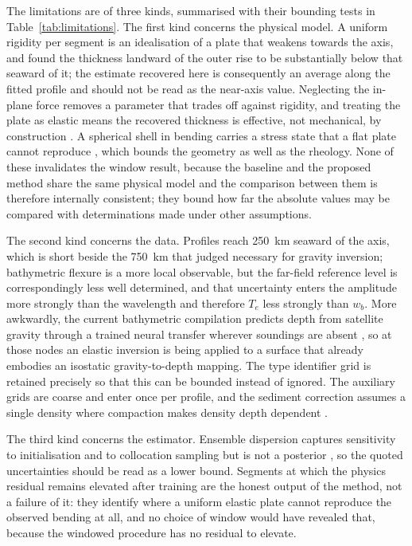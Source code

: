 \documentclass[final]{agujournal2019}
\begin{document}
The limitations are of three kinds, summarised with their bounding tests in
Table~\ref{tab:limitations}. The first kind concerns the physical model. A
uniform rigidity per segment is an idealisation of a plate that weakens towards
the axis, and  found the thickness landward of the outer
rise to be substantially below that seaward of it; the estimate recovered here
is consequently an average along the fitted profile and should not be read as
the near-axis value. Neglecting the in-plane force removes a parameter that
trades off against rigidity, and treating the plate as elastic means the
recovered thickness is effective, not mechanical, by construction
\cite{GoetzeEvans1979,WattsBurov2003}. A spherical shell in bending carries a stress state that a flat plate cannot
reproduce \cite{Tanimoto1998}, which bounds the geometry as well as the
rheology. None of these invalidates the window
result, because the baseline and the proposed method share the same physical
model and the comparison between them is therefore internally consistent; they
bound how far the absolute values may be compared with determinations made under
other assumptions.

The second kind concerns the data. Profiles reach 250~km seaward of the axis,
which is short beside the 750~km that  judged necessary
for gravity inversion; bathymetric flexure is a more local observable, but the
far-field reference level is correspondingly less well determined, and that
uncertainty enters the amplitude more strongly than the wavelength and therefore
$T_{e}$ less strongly than $w_{b}$. More awkwardly, the current bathymetric
compilation predicts depth from satellite gravity through a trained neural
transfer wherever soundings are absent \cite{GEBCO2023,Tozer2019}, so at
those nodes an elastic inversion is being applied to a surface that already
embodies an isostatic gravity-to-depth mapping. The type identifier grid is
retained precisely so that this can be bounded instead of ignored. The
auxiliary grids are coarse and enter once per profile, and the sediment
correction assumes a single density where compaction makes density depth
dependent \cite{Sykes1996,Straume2019}.

The third kind concerns the estimator. Ensemble dispersion captures sensitivity
to initialisation and to collocation sampling but is not a posterior
\cite{Psaros2023}, so the quoted uncertainties should be read as a lower bound.
Segments at which the physics residual remains elevated after training are the
honest output of the method, not a failure of it: they identify where a
uniform elastic plate cannot reproduce the observed bending at all, and no
choice of window would have revealed that, because the windowed procedure has no
residual to elevate.
\end{document}
